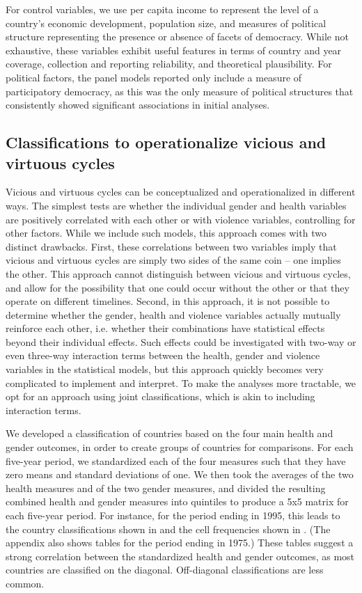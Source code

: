 \documentclass[12pt]{article}
\begin{document}
For control variables, we use per capita income to represent the level of a country's economic development, population size, and measures of political structure representing the presence or absence of facets of democracy. While not exhaustive, these variables exhibit useful features in terms of country and year coverage, collection and reporting reliability, and theoretical plausibility. For political factors, the panel models reported only include a measure of participatory democracy, as this was the only measure of political structures that consistently showed significant associations in initial analyses.

\subsection{Classifications to operationalize vicious and virtuous cycles}
\label{classifications}



Vicious and virtuous cycles can be conceptualized and operationalized in different ways.
The simplest tests are whether the individual gender and health variables are positively correlated with each other or with violence variables, controlling for other factors.
While we include such models, this approach comes with two distinct drawbacks.
First, these correlations between two variables imply that vicious and virtuous cycles are simply two sides of the same coin -- one implies the other.
This approach cannot distinguish between vicious and virtuous cycles, and allow for the possibility that one could occur without the other or that they operate on different timelines.
Second, in this approach, it is not possible to determine whether the gender, health and violence variables actually mutually reinforce each other, i.e. whether their combinations have statistical effects beyond their individual effects.
Such effects could be investigated with two-way or even three-way interaction terms between the health, gender and violence variables in the statistical models, but this approach quickly becomes very complicated to implement and interpret.
To make the analyses more tractable, we opt for an approach using joint classifications, which is akin to including interaction terms.



We developed a classification of countries based on the four main health and gender outcomes, in order to create groups of countries for comparisons.
For each five-year period, we standardized each of the four measures such that they have zero means and standard deviations of one.
We then took the averages of the two health measures and of the two gender measures, and divided the resulting combined health and gender measures into quintiles to produce a 5x5 matrix for each five-year period.
For instance, for the period ending in 1995, this leads to the country classifications shown in  and the cell frequencies shown in . (The appendix also shows tables for the period ending in 1975.) These tables suggest a strong correlation between the standardized health and gender outcomes, as most countries are classified on the diagonal. Off-diagonal classifications are less common.
\end{document}
